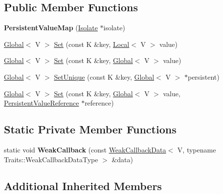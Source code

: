 \subsection*{Public Member Functions}
\begin{DoxyCompactItemize}
\item 
{\bfseries Persistent\+Value\+Map} (\hyperlink{classv8_1_1_isolate}{Isolate} $\ast$isolate)\hypertarget{classv8_1_1_persistent_value_map_af8000a75ef84fa719724dc4dadc1e5ee}{}\label{classv8_1_1_persistent_value_map_af8000a75ef84fa719724dc4dadc1e5ee}

\item 
\hyperlink{classv8_1_1_global}{Global}$<$ V $>$ \hyperlink{classv8_1_1_persistent_value_map_a4527a2e1b25a9f1772317f948382d9f9}{Set} (const K \&key, \hyperlink{classv8_1_1_local}{Local}$<$ V $>$ value)
\item 
\hyperlink{classv8_1_1_global}{Global}$<$ V $>$ \hyperlink{classv8_1_1_persistent_value_map_a00f89f1b7665698349f98b04d0059180}{Set} (const K \&key, \hyperlink{classv8_1_1_global}{Global}$<$ V $>$ value)
\item 
\hyperlink{classv8_1_1_global}{Global}$<$ V $>$ \hyperlink{classv8_1_1_persistent_value_map_a97ab74c7670e65dd5f95ec2940c4ab11}{Set\+Unique} (const K \&key, \hyperlink{classv8_1_1_global}{Global}$<$ V $>$ $\ast$persistent)
\item 
\hyperlink{classv8_1_1_global}{Global}$<$ V $>$ \hyperlink{classv8_1_1_persistent_value_map_a8128f8cff6ed0f3177e966b28cc081ba}{Set} (const K \&key, \hyperlink{classv8_1_1_global}{Global}$<$ V $>$ value, \hyperlink{classv8_1_1_persistent_value_map_base_1_1_persistent_value_reference}{Persistent\+Value\+Reference} $\ast$reference)
\end{DoxyCompactItemize}
\subsection*{Static Private Member Functions}
\begin{DoxyCompactItemize}
\item 
static void {\bfseries Weak\+Callback} (const \hyperlink{classv8_1_1_weak_callback_data}{Weak\+Callback\+Data}$<$ V, typename Traits\+::\+Weak\+Callback\+Data\+Type $>$ \&data)\hypertarget{classv8_1_1_persistent_value_map_a3666c5e5d35faec5b824f41c37fd8be1}{}\label{classv8_1_1_persistent_value_map_a3666c5e5d35faec5b824f41c37fd8be1}

\end{DoxyCompactItemize}
\subsection*{Additional Inherited Members}


